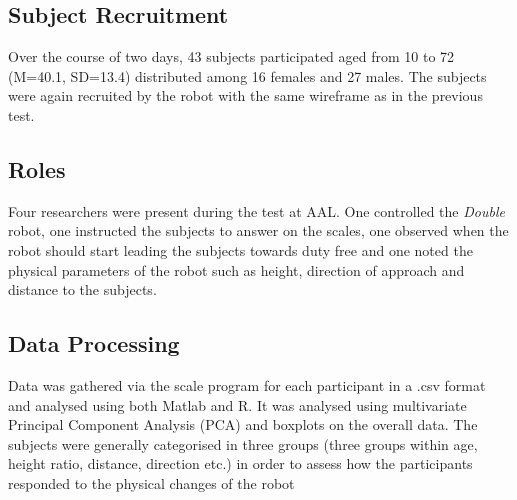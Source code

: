 \subsection{Subject Recruitment}
Over the course of two days, 43 subjects participated aged from 10 to 72 (M=40.1, SD=13.4) distributed among 16 females and 27 males. The subjects were again recruited by the robot with the same wireframe as in the previous test.

\subsection{Roles}
Four researchers were present during the test at AAL. One controlled the \textit{Double} robot, one instructed the subjects to answer on the scales, one observed when the robot should start leading the subjects towards duty free and one noted the physical parameters of the robot such as height, direction of approach and distance to the subjects.

\subsection{Data Processing}
Data was gathered via the scale program for each participant in a .csv format and analysed using both Matlab and R. It was analysed using multivariate Principal Component Analysis (PCA) and boxplots on the overall data. The subjects were generally categorised in three groups (three groups within age, height ratio, distance, direction etc.) in order to assess how the participants responded to the physical changes of the robot 
